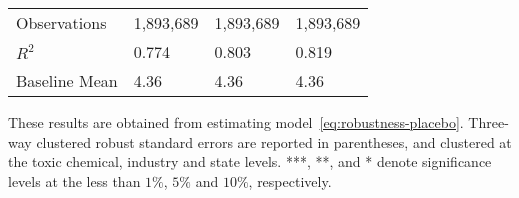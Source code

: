 \begin{table}[H]
{\begin{tabular}{@{}llll@{}}
            Observations                                             & 1,893,689 & 1,893,689 & 1,893,689 \\
            $R^2$                                                    & 0.774     & 0.803     & 0.819     \\
            Baseline Mean                                            & 4.36      & 4.36      & 4.36      \\ \bottomrule \bottomrule
        \end{tabular}%
    }
    \begin{minipage}{\columnwidth}
        \vspace{0.05in}
        These results are obtained from estimating model~\ref{eq:robustness-placebo}. Three-way clustered robust standard errors are reported in parentheses, and clustered at the toxic chemical, industry and state levels. ***, **, and * denote significance levels at the less than $1\%$, $5\%$ and $10\%$, respectively.
    \end{minipage}
\end{table}